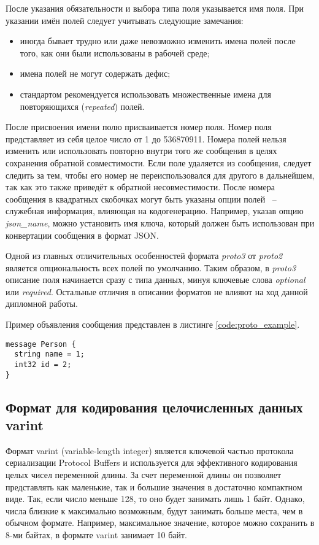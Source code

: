 После указания обязательности и выбора типа поля указывается имя поля. При указании имён полей следует учитывать следующие замечания:
\begin{itemize}
    \item иногда бывает трудно или даже невозможно изменить имена полей после того, как они были использованы в рабочей среде;
    \item имена полей не могут содержать дефис;
    \item стандартом рекомендуется использовать множественные имена для повторяющихся (\textit{repeated}) полей.
\end{itemize}

После присвоения имени полю присваивается номер поля. Номер поля представляет из себя целое число от 1 до 536870911.
Номера полей нельзя изменить или использовать повторно внутри того же сообщения в целях сохранения обратной совместимости.
Если поле удаляется из сообщения, следует следить за тем, чтобы его номер не переиспользовался для другого в дальнейшем, так как это также приведёт к обратной несовместимости.
После номера сообщения в квадратных скобочках могут быть указаны опции полей ~--~ служебная информация, влияющая на кодогенерацию. Например, указав опцию \textit{json\_name}, можно установить имя ключа, который должен быть использован при конвертации сообщения в формат JSON.

Одной из главных отличительных особенностей формата \textit{proto3} от \textit{proto2} является опциональность всех полей по умолчанию.
Таким образом, в \textit{proto3} описание поля начинается сразу с типа данных, минуя ключевые слова \textit{optional} или \textit{required}.
Остальные отличия в описании форматов не влияют на ход данной дипломной работы.

Пример объявления сообщения представлен в листинге \ref{code:proto_example}.

\begin{lstlisting}[style=CodeListing, label=code:proto_example, caption={Пример простейшего protobuf-сообщения}]
message Person {
  string name = 1;
  int32 id = 2;
}
\end{lstlisting}

\subsection{Формат для кодирования целочисленных данных varint}
Формат varint (variable-length integer) является ключевой частью протокола сериализации Protocol Buffers 
и используется для эффективного кодирования целых чисел переменной длины. За счет переменной длины он позволяет 
представлять как маленькие, так и большие значения в достаточно компактном виде.
Так, если число меньше 128, то оно будет занимать лишь 1 байт. Однако, числа близкие к максимально возможным, 
будут занимать больше места, чем в обычном формате.
Например, максимальное значение, которое можно сохранить в 8-ми байтах, в формате varint занимает 10 байт.

